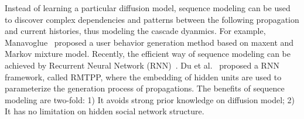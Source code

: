 % 

Instead of learning a particular diffusion model, sequence modeling can be
used to discover complex dependencies and patterns between the following
propagation and current histories, thus modeling the cascade dyanmics.
For example, Manavoglue~\cite{Manavoglu2003userbehaviormodels} proposed a user
behavior generation method based on maxent and Markov mixture model. Recently,
the efficient way of sequence modeling can be achieved by Recurrent Neural
Network
(RNN)~\cite{goldberg2014word2vec,mikolov2010recurrent,sundermeyer2012lstm}.
Du et al.~\cite{DuKDD2016} proposed a RNN framework, called RMTPP,
where the embedding of hidden units are used to parameterize the generation
process of propagations. The benefits of sequence modeling are two-fold: 1)
It avoids strong prior knowledge on diffusion model; 2) It has no limitation on
hidden social network structure. 

% 

